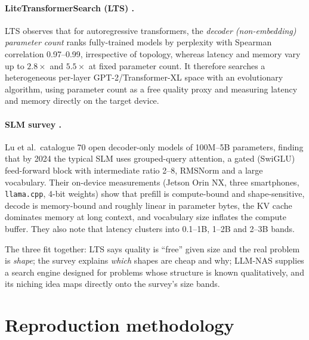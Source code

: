 \documentclass[11pt,a4paper]{article}
\newcommand{\code}[1]{\texttt{#1}}
\begin{document}
\paragraph{LiteTransformerSearch (LTS) \cite{lts}.} LTS observes that for autoregressive transformers, the \emph{decoder (non-embedding) parameter count} ranks fully-trained models by perplexity with Spearman correlation 0.97--0.99, irrespective of topology, whereas latency and memory vary up to $2.8\times$ and $5.5\times$ at fixed parameter count. It therefore searches a heterogeneous per-layer GPT-2/Transformer-XL space with an evolutionary algorithm, using parameter count as a free quality proxy and measuring latency and memory directly on the target device.

\paragraph{SLM survey \cite{slmsurvey}.} Lu et al.\ catalogue 70 open decoder-only models of 100M--5B parameters, finding that by 2024 the typical SLM uses grouped-query attention, a gated (SwiGLU) feed-forward block with intermediate ratio 2--8, RMSNorm and a large vocabulary. Their on-device measurements (Jetson Orin NX, three smartphones, \code{llama.cpp}, 4-bit weights) show that prefill is compute-bound and shape-sensitive, decode is memory-bound and roughly linear in parameter bytes, the KV cache dominates memory at long context, and vocabulary size inflates the compute buffer. They also note that latency clusters into 0.1--1B, 1--2B and 2--3B bands.

The three fit together: LTS says quality is ``free'' given size and the real problem is \emph{shape}; the survey explains \emph{which} shapes are cheap and why; LLM-NAS supplies a search engine designed for problems whose structure is known qualitatively, and its niching idea maps directly onto the survey's size bands.

\section{Reproduction methodology}\label{sec:method}
\end{document}
